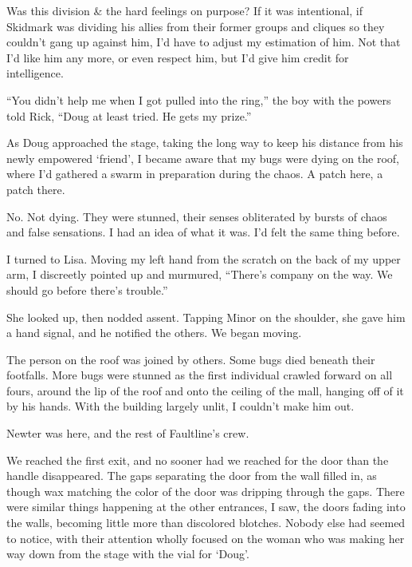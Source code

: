 Was this division & the hard feelings on purpose?  If it was intentional, if Skidmark was dividing his allies from their former groups and cliques so they couldn't gang up against him, I'd have to adjust my estimation of him.  Not that I'd like him any more, or even respect him, but I'd give him credit for intelligence.



``You didn't help me when I got pulled into the ring,'' the boy with the powers told Rick, ``Doug at least tried.  He gets my prize.''



As Doug approached the stage, taking the long way to keep his distance from his newly empowered `friend', I became aware that my bugs were dying on the roof, where I'd gathered a swarm in preparation during the chaos.  A patch here, a patch there.



No.  Not dying.  They were stunned, their senses obliterated by bursts of chaos and false sensations.  I had an idea of what it was.  I'd felt the same thing before.



I turned to Lisa.  Moving my left hand from the scratch on the back of my upper arm, I discreetly pointed up and murmured, ``There's company on the way.  We should go before there's trouble.''



She looked up, then nodded assent.  Tapping Minor on the shoulder, she gave him a hand signal, and he notified the others.  We began moving.



The person on the roof was joined by others.  Some bugs died beneath their footfalls.  More bugs were stunned as the first individual crawled forward on all fours, around the lip of the roof and onto the ceiling of the mall, hanging off of it by his hands.  With the building largely unlit, I couldn't make him out.



Newter was here, and the rest of Faultline's crew.



We reached the first exit, and no sooner had we reached for the door than the handle disappeared.  The gaps separating the door from the wall filled in, as though wax matching the color of the door was dripping through the gaps.  There were similar things happening at the other entrances, I saw, the doors fading into the walls, becoming little more than discolored blotches.  Nobody else had seemed to notice, with their attention wholly focused on the woman who was making her way down from the stage with the vial for `Doug'.



